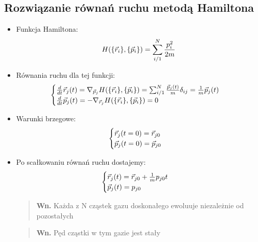 \subsection{Rozwiązanie równań ruchu metodą Hamiltona}
\begin{itemize}
\item Funkcja Hamiltona:
\begin{equation}H(\{\vec{r}_i\},\{\vec{p}_i\})=\sum_{i/1}^{N}\frac{p_i^2}{2m}\end{equation}
\item Równania ruchu dla tej funkcji:
\begin{equation}\begin{cases} \frac{d}{dt} \vec{r}_j(t)=\nabla_{\vec{p}_j} H(\{\vec{r}_i\},\{\vec{p}_i\})=\sum_{i/1}^{N}\frac{\vec{p}_j(t)}{m}\delta_{ij}=\frac{1}{m}\vec{p}_j(t)\\ \frac{d}{dt}\vec{p}_j(t)=-\nabla_{\vec{r}_j} H(\{\vec{r}_i\},\{\vec{p}_i\})=0\end{cases}\end{equation} 
\item Warunki brzegowe:
\begin{equation}\begin{cases} \vec{r}_j(t=0)=\vec{r}_{j0} \\ \vec{p}_j(t=0)=\vec{p}_{j0}\end{cases}\end{equation}
\item Po scałkowaniu równań ruchu dostajemy:
\begin{equation}\begin{cases} \vec{r}_j(t)=\vec{r}_{j0}+\frac{1}{m}p_{j0}t\\ \vec{p}_j(t)=p_{j0}\end{cases} \label{RRuchu}\end{equation}
\begin{verse}\textbf{Wn.} Każda z N cząstek gazu doskonałego ewoluuje niezależnie od pozostałych\end{verse}
\begin{verse}\textbf{Wn.} Pęd cząstki w tym gazie jest stały \end{verse}
\end{itemize}
